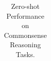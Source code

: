 \begin{table}[t!]
{\begin{tabular}{@{}lcccccccccccc@{}}
\bottomrule

  \end{tabular}
  }
   \caption{Zero-shot Performance on Commonsense Reasoning Tasks. 
   }
  \label{tab:commonsense_reasoning}
\end{table}